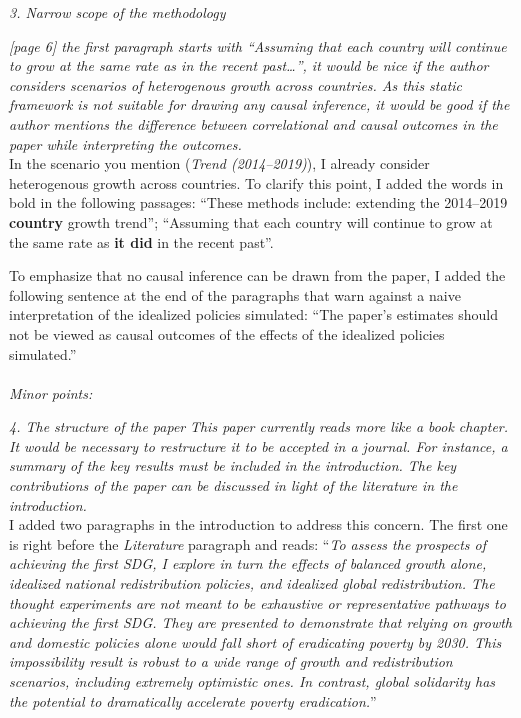\documentclass[12pt,english]{article}
\begin{document}
\textit{3.	Narrow scope of the methodology}

\textit{[page 6] the first paragraph starts with “Assuming that each country will continue to grow at the same rate as in the recent past…”, it would be nice if the author considers scenarios of heterogenous growth across countries. As this static framework is not suitable for drawing any causal inference, it would be good if the author mentions the difference between correlational and causal outcomes in the paper while interpreting the outcomes. }~\\

In the scenario you mention (\textit{Trend (2014--2019)}), I already consider heterogenous growth across countries. To clarify this point, I added the words in bold in the following passages: ``These methods include: extending the 2014--2019 \textbf{country} growth trend''; ``Assuming that each country will continue to grow at the same rate as \textbf{it did} in the recent past''. 

To emphasize that no causal inference can be drawn from the paper, I added the following sentence at the end of the paragraphs that warn against a naive interpretation of the idealized policies simulated: ``The paper's estimates should not be viewed as causal outcomes of the effects of the idealized policies simulated.''
~\\ ~\\

\textit{Minor points:}
 
\textit{4.	The structure of the paper}
\textit{This paper currently reads more like a book chapter. It would be necessary to restructure it to be accepted in a journal. For instance, a summary of the key results must be included in the introduction. The key contributions of the paper can be discussed in light of the literature in the introduction.}~\\

I added two paragraphs in the introduction to address this concern. The first one is right before the \textit{Literature} paragraph and reads: ``\textit{To assess the prospects of achieving the first SDG, I explore in turn the effects of balanced growth alone, idealized national redistribution policies, and idealized global redistribution. The thought experiments are not meant to be exhaustive or representative pathways to achieving the first SDG. They are presented to demonstrate that relying on growth and domestic policies alone would fall short of eradicating poverty by 2030. This impossibility result is robust to a wide range of growth and redistribution scenarios, including extremely optimistic ones. In contrast, global solidarity has the potential to dramatically accelerate poverty eradication.}''
\end{document}
